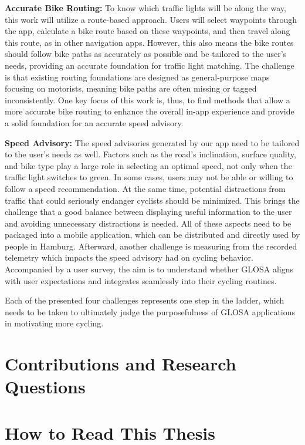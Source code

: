 \textbf{\color{cidarkblue}Accurate Bike Routing:} To know which traffic lights will be along the way, this work will utilize a route-based approach. Users will select waypoints through the app, calculate a bike route based on these waypoints, and then travel along this route, as in other navigation apps. However, this also means the bike routes should follow bike paths as accurately as possible and be tailored to the user's needs, providing an accurate foundation for traffic light matching. The challenge is that existing routing foundations are designed as general-purpose maps focusing on motorists, meaning bike paths are often missing or tagged inconsistently. One key focus of this work is, thus, to find methods that allow a more accurate bike routing to enhance the overall in-app experience and provide a solid foundation for an accurate speed advisory.

\textbf{\color{cidarkblue}Speed Advisory:} The speed advisories generated by our app need to be tailored to the user's needs as well. Factors such as the road's inclination, surface quality, and bike type play a large role in selecting an optimal speed, not only when the traffic light switches to green. In some cases, users may not be able or willing to follow a speed recommendation. At the same time, potential distractions from traffic that could seriously endanger cyclists should be minimized. This brings the challenge that a good balance between displaying useful information to the user and avoiding unnecessary distractions is needed. All of these aspects need to be packaged into a mobile application, which can be distributed and directly used by people in Hamburg. Afterward, another challenge is measuring from the recorded telemetry which impacts the speed advisory had on cycling behavior. Accompanied by a user survey, the aim is to understand whether GLOSA aligns with user expectations and integrates seamlessly into their cycling routines.

Each of the presented four challenges represents one step in the ladder, which needs to be taken to ultimately judge the purposefulness of GLOSA applications in motivating more cycling.

\section{Contributions and Research Questions}



\section{How to Read This Thesis}


